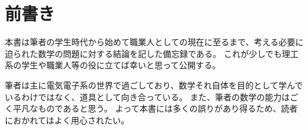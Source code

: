 \part{前書き}
    本書は筆者の学生時代から始めて職業人としての現在に至るまで、考える必要に迫られた数学の問題に対する結論を記した備忘録である。
    これが少しでも理工系の学生や職業人等の役に立てば幸いと思って公開する。
    \par
    筆者は主に電気電子系の世界で過ごしており、数学それ自体を目的として学んでいるわけではなく、道具として向き合っている。
    また、筆者の数学の能力はごく平凡なものであると思う。
    よって本書には多くの誤りがあり得るため、読者におかれてはよく用心されたい。
